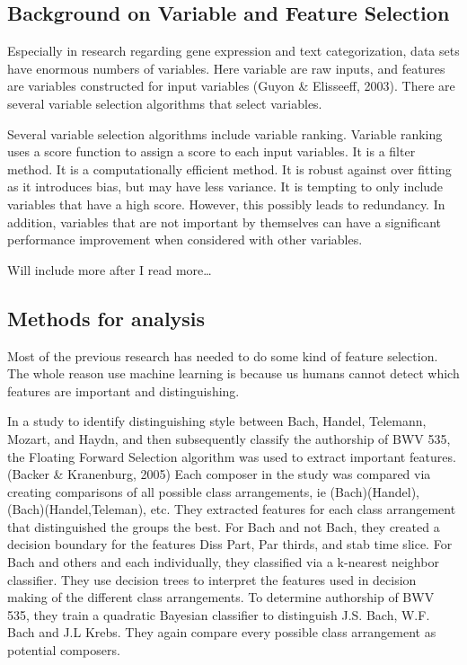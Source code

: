 \documentclass[12pt,twoside]{reedthesis}
\theoremstyle{definition}
\theoremstyle{definition}
\theoremstyle{definition}
\theoremstyle{remark}
\begin{document}
\subsection{Background on Variable and Feature
Selection}\label{background-on-variable-and-feature-selection}

Especially in research regarding gene expression and text
categorization, data sets have enormous numbers of variables. Here
variable are raw inputs, and features are variables constructed for
input variables (Guyon \& Elisseeff, 2003). There are several variable
selection algorithms that select variables.

Several variable selection algorithms include variable ranking. Variable
ranking uses a score function to assign a score to each input variables.
It is a filter method. It is a computationally efficient method. It is
robust against over fitting as it introduces bias, but may have less
variance. It is tempting to only include variables that have a high
score. However, this possibly leads to redundancy. In addition,
variables that are not important by themselves can have a significant
performance improvement when considered with other variables.

Will include more after I read more\ldots{}

\subsection{Methods for analysis}\label{methods-for-analysis}

Most of the previous research has needed to do some kind of feature
selection. The whole reason use machine learning is because us humans
cannot detect which features are important and distinguishing.

In a study to identify distinguishing style between Bach, Handel,
Telemann, Mozart, and Haydn, and then subsequently classify the
authorship of BWV 535, the Floating Forward Selection algorithm was used
to extract important features. (Backer \& Kranenburg, 2005) Each
composer in the study was compared via creating comparisons of all
possible class arrangements, ie (Bach)(Handel), (Bach)(Handel,Teleman),
etc. They extracted features for each class arrangement that
distinguished the groups the best. For Bach and not Bach, they created a
decision boundary for the features Diss Part, Par thirds, and stab time
slice. For Bach and others and each individually, they classified via a
k-nearest neighbor classifier. They use decision trees to interpret the
features used in decision making of the different class arrangements. To
determine authorship of BWV 535, they train a quadratic Bayesian
classifier to distinguish J.S. Bach, W.F. Bach and J.L Krebs. They again
compare every possible class arrangement as potential composers.
\end{document}
